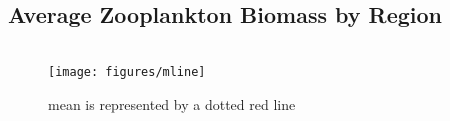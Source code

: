 \documentclass[
]{book}
\begin{document}
\hypertarget{average-zooplankton-biomass-by-region}{%
\subsection{Average Zooplankton Biomass by Region}\label{average-zooplankton-biomass-by-region}}

\begin{columns-nocenter}

\begin{column}

\begin{figure}
\texttt{[image: figures/mline]} \caption{mean is represented by a dotted red line}\label{fig:unnamed-chunk-26}
\end{figure}

\end{column}

\begin{column}

\end{column}

\begin{column}

\end{column}

\end{columns-nocenter}
\end{document}
